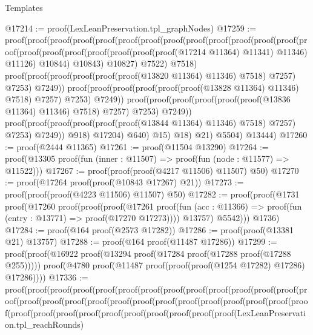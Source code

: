 \begin{lexlean}{Templates}
\begin{coremodule}
@17214 := proof(LexLeanPreservation.tpl_graphNodes)
@17259 := proof(proof(proof(proof(proof(proof(proof(proof(proof(proof(proof(proof(proof(proof(proof(proof(proof(proof(proof(proof(proof(@17214
                                              @11364)
                                            @11341)
                                          @11346)
                                        @11126)
                                      @10844)
                                    @10843)
                                  @10827)
                                @7522)
                              @7518)
                            proof(proof(proof(proof(proof(proof(@13820 @11364) @11346) @7518) @7257)
                                  @7253)
                                @7249))
                          proof(proof(proof(proof(proof(proof(@13828 @11364) @11346) @7518) @7257)
                                @7253)
                              @7249))
                        proof(proof(proof(proof(proof(proof(@13836 @11364) @11346) @7518) @7257)
                              @7253)
                            @7249))
                      proof(proof(proof(proof(proof(proof(@13844 @11364) @11346) @7518) @7257)
                            @7253)
                          @7249))
                    @918)
                  @17204)
                @640)
              @15)
            @18)
          @21)
        @5504)
      @13444)
@17260 := proof(@2444 @11365)
@17261 := proof(@11504 @13290)
@17264 := proof(@13305 proof(fun (inner : @11507) => proof(fun (node : @11577) => @11522)))
@17267 := proof(proof(proof(@4217 @11506) @11507) @50)
@17270 := proof(@17264 proof(proof(@10843 @17267) @21))
@17273 := proof(proof(proof(@4223 @11506) @11507) @50)
@17282 := proof(proof(@1731
        proof(@17260
            proof(proof(proof(@17261
                    proof(fun (acc : @11366) =>
                      proof(fun (entry : @13771) => proof(@17270 @17273))))
                  @13757)
                @5542)))
      @1736)
@17284 := proof(@164 proof(@2573 @17282))
@17286 := proof(proof(@13381 @21) @13757)
@17288 := proof(@164 proof(@11487 @17286))
@17299 := proof(proof(@16922 proof(@13294 proof(@17284 proof(@17288 proof(@17288 @255)))))
      proof(@4780 proof(@11487 proof(proof(proof(@1254 @17282) @17286) @17286))))
@17336 := proof(proof(proof(proof(proof(proof(proof(proof(proof(proof(proof(proof(proof(proof(proof(proof(proof(proof(proof(proof(proof(proof(proof(proof(proof(proof(proof(proof(proof(proof(proof(proof(proof(proof(proof(proof(proof(LexLeanPreservation.tpl_reachRounds)

\end{coremodule}
\end{lexlean}
